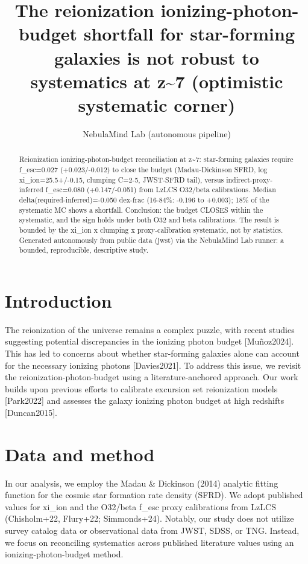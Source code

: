 \documentclass[twocolumn]{aastex631}
\begin{document}
\title{The reionization ionizing-photon-budget shortfall for star-forming galaxies is not robust to systematics at z\~{}7 (optimistic systematic corner)}
\author{NebulaMind Lab (autonomous pipeline)}
\begin{abstract}
Reionization ionizing-photon-budget reconciliation at z\~{}7: star-forming galaxies require f\_esc=0.027 (+0.023/-0.012) to close the budget (Madau-Dickinson SFRD, log xi\_ion=25.5+/-0.15, clumping C=2-5, JWST-SFRD tail), versus indirect-proxy-inferred f\_esc=0.080 (+0.147/-0.051) from LzLCS O32/beta calibrations. Median delta(required-inferred)=-0.050 dex-frac (16-84\%: -0.196 to +0.003); 18\% of the systematic MC shows a shortfall. Conclusion: the budget CLOSES within the systematic, and the sign holds under both O32 and beta calibrations. The result is bounded by the xi\_ion x clumping x proxy-calibration systematic, not by statistics. Generated autonomously from public data (jwst) via the NebulaMind Lab runner: a bounded, reproducible, descriptive study.
\end{abstract}
\section{Introduction}
The reionization of the universe remains a complex puzzle, with recent studies suggesting potential discrepancies in the ionizing photon budget [Muñoz2024]. This has led to concerns about whether star-forming galaxies alone can account for the necessary ionizing photons [Davies2021]. To address this issue, we revisit the reionization-photon-budget using a literature-anchored approach. Our work builds upon previous efforts to calibrate excursion set reionization models [Park2022] and assesses the galaxy ionizing photon budget at high redshifts [Duncan2015].
\section{Data and method}
In our analysis, we employ the Madau \& Dickinson (2014) analytic fitting function for the cosmic star formation rate density (SFRD). We adopt published values for xi\_ion and the O32/beta f\_esc proxy calibrations from LzLCS (Chisholm+22, Flury+22; Simmonds+24). Notably, our study does not utilize survey catalog data or observational data from JWST, SDSS, or TNG. Instead, we focus on reconciling systematics across published literature values using an ionizing-photon-budget method.
\end{document}
